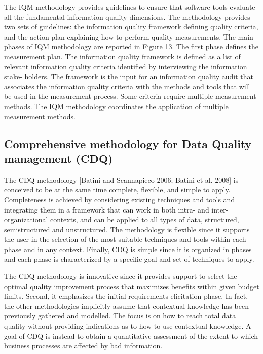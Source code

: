 \documentclass[pdftex,english,oribibl]{llncs}
\begin{document}
    The IQM methodology provides guidelines to ensure that software tools evaluate all the fundamental information quality dimensions.
    The methodology provides two sets of guidelines: the information quality framework defining quality criteria, and the action plan explaining how to perform quality measurements.
    The main phases of IQM methodology are reported in Figure 13. The first phase defines the measurement plan.
    The information quality framework is defined as a list of relevant information quality criteria identified by interviewing the information stake- holders.
    The framework is the input for an information quality audit that associates the information quality criteria with the methods and tools that will be used in the measurement process.
    Some criteria require multiple measurement methods. The IQM methodology coordinates the application of multiple measurement methods.

    \subsection{Comprehensive methodology for Data Quality management (CDQ)}

    The CDQ methodology [Batini and Scannapieco 2006; Batini et al. 2008] is conceived to be at the same time complete, flexible, and simple to apply.
    Completeness is achieved by considering existing techniques and tools and integrating them in a framework that can work in both intra- and inter-organizational contexts, and can be applied to all types of data, structured, semistructured and unstructured.
    The methodology is flexible since it supports the user in the selection of the most suitable techniques and tools within each phase and in any context.
    Finally, CDQ is simple since it is organized in phases and each phase is characterized by a specific goal and set of techniques to apply.

    The CDQ methodology is innovative since it provides support to select the optimal quality improvement process that maximizes benefits within given budget limits.
    Second, it emphasizes the initial requirements elicitation phase. In fact, the other methodologies implicitly assume that contextual knowledge has been previously gathered and modelled.
    The focus is on how to reach total data quality without providing indications as to how to use contextual knowledge.
    A goal of CDQ is instead to obtain a quantitative assessment of the extent to which business processes are affected by bad information.
\end{document}
